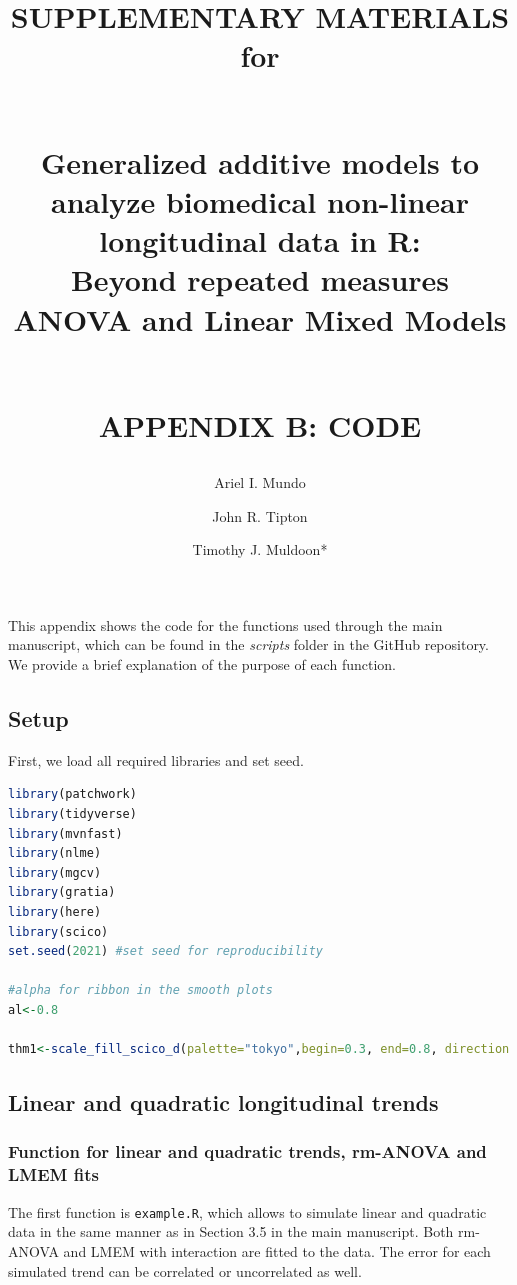\documentclass[
]{article}
\author{Ariel I. Mundo \orcidaffila{}}
\author{John R. Tipton \orcidaffilb{}}
\author{Timothy J. Muldoon*}
\affil{tmuldoon@uark.edu}
\title{SUPPLEMENTARY MATERIALS for\\
\strut \\
\textbf{Generalized additive models to analyze biomedical non-linear longitudinal data in R:}\\
Beyond repeated measures ANOVA and Linear Mixed Models\\
\strut \\
APPENDIX B: CODE}
\author{}
\date{\vspace{-2.5em}}
\newcommand{\passthrough}[1]{#1}
\begin{document}
\maketitle

\newpage


This appendix shows the code for the functions used through the main manuscript, which can be found in the \emph{scripts} folder in the GitHub repository. We provide a brief explanation of the purpose of each function.

\hypertarget{setup}{%
\subsection{Setup}\label{setup}}

First, we load all required libraries and set seed.

\begin{lstlisting}[language=R]
library(patchwork)
library(tidyverse)
library(mvnfast)
library(nlme)
library(mgcv)
library(gratia)
library(here)
library(scico)
set.seed(2021) #set seed for reproducibility

#alpha for ribbon in the smooth plots
al<-0.8

thm1<-scale_fill_scico_d(palette="tokyo",begin=0.3, end=0.8, direction = -1, aesthetics = c("colour","fill"))
\end{lstlisting}

\hypertarget{linear-and-quadratic-longitudinal-trends}{%
\subsection{Linear and quadratic longitudinal trends}\label{linear-and-quadratic-longitudinal-trends}}

\hypertarget{function-for-linear-and-quadratic-trends-rm-anova-and-lmem-fits}{%
\subsubsection{Function for linear and quadratic trends, rm-ANOVA and LMEM fits}\label{function-for-linear-and-quadratic-trends-rm-anova-and-lmem-fits}}

The first function is \passthrough{\lstinline!example.R!}, which allows to simulate linear and quadratic data in the same manner as in Section 3.5 in the main manuscript. Both rm-ANOVA and LMEM with interaction are fitted to the data. The error for each simulated trend can be correlated or uncorrelated as well.
\end{document}
